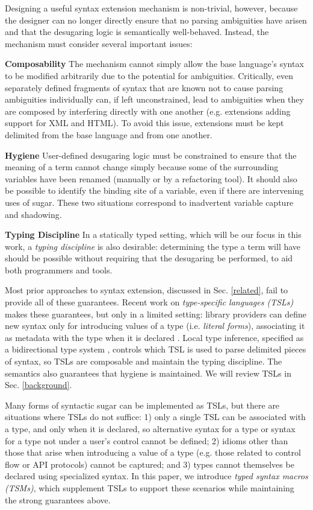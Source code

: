\documentclass{sig-alternate}
\begin{document}
Designing a useful syntax extension mechanism is non-trivial, however, because the designer can no longer  directly ensure that no parsing ambiguities have arisen and that the desugaring logic is semantically well-behaved. Instead, the mechanism must consider several important issues:

\noindent
\textbf{Composability} The mechanism cannot simply allow the base language's syntax to  be modified arbitrarily due to the potential for ambiguities. Critically, even separately defined fragments of syntax that are known not to cause parsing ambiguities individually can, if left unconstrained, lead to ambiguities when they are composed by interfering directly with one another (e.g. extensions adding support for XML and HTML). To avoid this issue, extensions must be kept delimited from the base language and from one another. 

\noindent
\textbf{Hygiene} User-defined desugaring logic must be constrained to ensure that the meaning of a term cannot change simply because some of the surrounding variables have been renamed (manually or by a refactoring tool). It should also be possible to identify the binding site of a variable, even if there are intervening uses of sugar. These two situations correspond to inadvertent variable capture and shadowing. 

\noindent
\textbf{Typing Discipline} In a statically typed setting, which will be our focus in this work, a \emph{typing discipline} is also desirable: determining the type a term will have should be possible without requiring that the desugaring be performed, to aid both programmers and tools. 

Most prior approaches to syntax extension, discussed in Sec. \ref{related}, fail to provide all of these guarantees. Recent work on \emph{type-specific languages  (TSLs)} makes these guarantees, but only in a limited setting: library providers can define new syntax only for introducing values of a type (i.e. \emph{literal forms}), associating it as metadata with the type when it is declared \cite{TSLs}. Local type inference, specified as a bidirectional type system \cite{Pierce:2000:LTI:345099.345100}, controls which TSL is used to parse delimited pieces of syntax, so TSLs are composable and maintain the typing discipline. The semantics also guarantees that hygiene is maintained. We will review TSLs in Sec. \ref{background}. 

Many forms of syntactic sugar can be implemented as TSLs, but there are situations where TSLs do not suffice: 1) only a single TSL can be associated with a type, and only when it is declared, so alternative syntax for a type or syntax for a type not under a user's control cannot be defined; 2) idioms other than those that arise when introducing a value of a type (e.g. those related to control flow or API protocols) cannot be captured; and 3) types cannot themselves be declared using specialized syntax. In this paper, we introduce \emph{typed syntax macros (TSMs)}, which supplement TSLs to support these scenarios while maintaining the strong guarantees above.%
\end{document}
